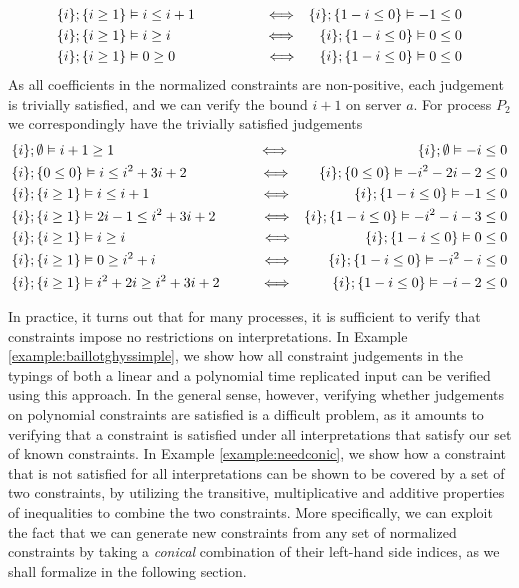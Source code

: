 \begin{examp}
\begin{align*}
    &\{i\};\{i \geq 1\} \vDash i \leq i + 1\kern5em\Longleftrightarrow &  \{i\};\{1-i \leq 0\} \vDash -1 \leq 0\\
    &\{i\};\{i \geq 1\} \vDash i \geq i\kern6.7em\Longleftrightarrow &  \{i\};\{1-i \leq 0\} \vDash 0 \leq 0\\
    &\{i\};\{i \geq 1\} \vDash 0 \geq 0\kern6.45em\Longleftrightarrow &  \{i\};\{1-i \leq 0\} \vDash 0 \leq 0
\end{align*}
%
As all coefficients in the normalized constraints are non-positive, each judgement is trivially satisfied, and we can verify the bound $i + 1$ on server $a$. For process $P_2$ we correspondingly have the trivially satisfied judgements
\begin{align*}
    &\{i\};\emptyset\vDash i + 1 \geq 1\kern10.3em\Longleftrightarrow &  \{i\};\emptyset\vDash -i \leq 0\\
    &\{i\};\{0 \leq 0\}\vDash i \leq i^2 + 3i + 2\kern5.2em\Longleftrightarrow &  \{i\};\{0\leq 0\}\vDash -i^2-2i-2 \leq 0\\
    &\{i\};\{i \geq 1\} \vDash i \leq i + 1\kern7.9em\Longleftrightarrow &  \{i\};\{1-i \leq 0\} \vDash -1 \leq 0\\
    &\{i\};\{i \geq 1\} \vDash 2i-1 \leq i^2 + 3i + 2\kern3.2em\Longleftrightarrow &  \{i\};\{1-i \leq 0\} \vDash -i^2-i-3 \leq 0\\
    &\{i\};\{i \geq 1\} \vDash i \geq i\kern9.7em\Longleftrightarrow &  \{i\};\{1-i \leq 0\} \vDash 0 \leq 0\\
    &\{i\};\{i \geq 1\} \vDash 0 \geq i^2+i\kern7.5em\Longleftrightarrow &  \{i\};\{1-i \leq 0\} \vDash -i^2-i \leq 0\\
    &\{i\};\{i \geq 1\} \vDash i^2+2i \geq i^2+3i+2\kern2.9em\Longleftrightarrow &  \{i\};\{1-i \leq 0\} \vDash -i-2 \leq 0
\end{align*}

\end{examp}
%
In practice, it turns out that for many processes, it is sufficient to verify that constraints impose no restrictions on interpretations. In Example \ref{example:baillotghyssimple}, we show how all constraint judgements in the typings of both a linear and a polynomial time replicated input can be verified using this approach. In the general sense, however, verifying whether judgements on polynomial constraints are satisfied is a difficult problem, as it amounts to verifying that a constraint is satisfied under all interpretations that satisfy our set of known constraints. In Example \ref{example:needconic}, we show how a constraint that is not satisfied for all interpretations can be shown to be covered by a set of two constraints, by utilizing the transitive, multiplicative and additive properties of inequalities to combine the two constraints. More specifically, we can exploit the fact that we can generate new constraints from any set of normalized constraints by taking a \textit{conical} combination of their left-hand side indices, as we shall formalize in the following section.
